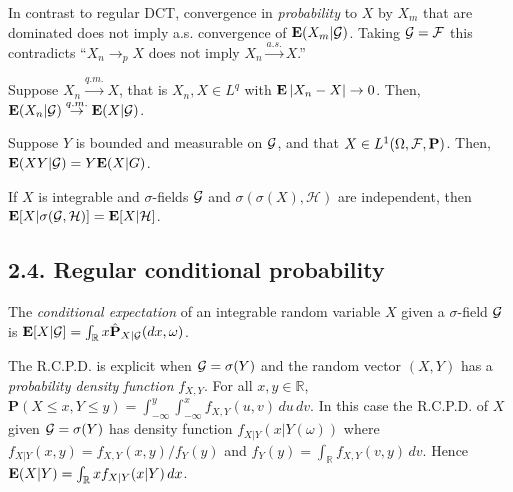 \begin{remark*}
In contrast to regular DCT, convergence in \emph{probability} to $X$ by $X_m$ that are dominated does not imply a.s. convergence of $\mathbf{E}(X_m|\mathcal{G})$. Taking $\mathcal{G}=\mathcal{F}$ this contradicts ``$X_n \to_p X$ does not imply $X_n \overset{a.s.}{\to} X$.''
\end{remark*}

\begin{theorem*}
Suppose $X_n \overset{q.m.}{\to} X$, that is $X_n,X\in L^q$ with $\mathbf{E}\left\lvert X_n-X \right\rvert\to0$. Then, $\mathbf{E}(X_n|\mathcal{G})\overset{q.m.}{\to}\mathbf{E}(X|\mathcal{G})$.
\end{theorem*}

\begin{proposition*}
Suppose $Y$ is bounded and measurable on $\mathcal{G}$, and that $X \in L^1(\Omega,\mathcal{F},\mathbf P)$. Then, $\mathbf{E}(XY|\mathcal{G}) = Y\mathbf{E}(X|G)$.
\end{proposition*}

\begin{proposition*}
If $X$ is integrable and $\sigma$-fields $\mathcal{G}$ and $\sigma(\sigma(X),\mathcal H)$ are independent, then $\mathbf{E}[X|\sigma(\mathcal{G},\mathcal H)] = \mathbf{E}[X|\mathcal H]$.
\end{proposition*}

\subsection*{2.4. Regular conditional probability}


\begin{definition*}
The \emph{conditional expectation} of an integrable random variable $X$ given a $\sigma$-field $\mathcal{G}$ is $\mathbf{E}[X|\mathcal{G}] = \int_{\mathbb R} x \hat{\mathbf P}_{X|\mathcal{G}} (dx,\omega)$.
\end{definition*}

\begin{example*}
The R.C.P.D. is explicit when $\mathcal{G} = \sigma(Y)$ and the random vector $(X,Y)$ has a \emph{probability density function} $f_{X,Y}$. For all $x,y\in\mathbb R$, $\mathbf P(X \leq x, Y \leq y) = \int_{-\infty}^y \int_{-\infty}^x f_{X,Y}(u,v) \, du \, dv$. In this case the R.C.P.D. of $X$ given $\mathcal{G}=\sigma(Y)$ has density function $f_{X|Y}(x|Y(\omega))$ where $f_{X|Y}(x,y) = f_{X,Y}(x,y) / f_Y(y)$ and $f_Y(y) = \int_{\mathbb R} f_{X,Y}(v,y)\,dv$. Hence $\mathbf{E}(X|Y) = \int_{\mathbb R} x f_{X|Y}(x|Y)\,dx$.
\end{example*}